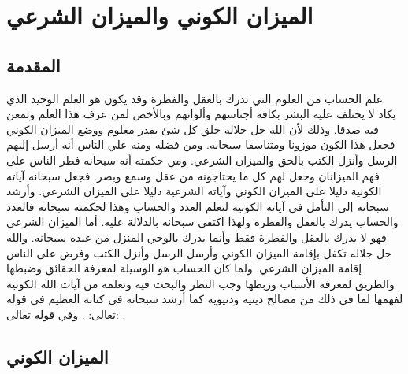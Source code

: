 \chapter{الميزان الكوني والميزان الشرعي}

\section{المقدمة}

علم الحساب من العلوم التي تدرك بالعقل والفطرة وقد يكون هو العلم الوحيد الذي يكاد لا يختلف عليه البشر بكافة أجناسهم وألوانهم وبالأخص لمن عرف هذا العلم وتمعن فيه صدقا. وذلك لأن الله جل جلاله خلق كل شئ بقدر معلوم ووضع الميزان الكوني فجعل هذا الكون موزونا ومتناسقا سبحانه. ومن فضله ومنه علي الناس أنه أرسل إليهم الرسل وأنزل الكتب بالحق والميزان الشرعي. ومن حكمته أنه سبحانه فطر الناس على فهم الميزانان وجعل لهم كل ما يحتاجونه من عقل وسمع وبصر. فجعل سبحانه آياته الكونية دليلا على الميزان الكوني وآياته الشرعية دليلا على الميزان الشرعي. وأرشد سبحانه إلى التأمل في آياته الكونية لتعلم العدد والحساب وهذا لحكمته سبحانه فالعدد والحساب يدرك بالعقل والفطرة ولهذا اكتفى سبحانه بالدلالة عليه. أما الميزان الشرعي فهو لا يدرك بالعقل والفطرة فقط وأنما يدرك بالوحي المنزل من عنده سبحانه. والله جل جلاله تكفل بإقامة الميزان الكوني وأرسل الرسل وأنزل الكتب وفرض على الناس إقامة الميزان الشرعي. ولما كان الحساب هو الوسيلة لمعرفة الحقائق وضبطها والطريق لمعرفة الأسباب وربطها وجب النظر والبحث فيه وتعلمه من آيات الله الكونية لفهمها لما في ذلك من مصالح دينية ودنيوية كما أرشد سبحانه في  كتابه العظيم في قوله تعالى: \quranayah*[10][5]{\footnotesize \surahname*[10]}. وفي قوله تعالى:
\quranayah*[17][12]{\footnotesize \surahname*[17]}.

\section{الميزان الكوني}

